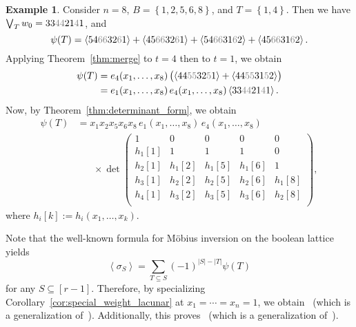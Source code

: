 \documentclass[reqno]{amsart}
\newcommand{\0}{\phantom{c}}
\newcommand{\swt}[1]{\left\langle #1 \right\rangle} %
\let\sumnonlimits\sum
\renewcommand{\sum}{\sumnonlimits\limits}
\newcommand{\set}[1]{\left\{ #1 \right\}}
\newcommand{\ive}[1]{\left[ #1 \right]}
\theoremstyle{plain}
\theoremstyle{definition}
\newtheorem{example}[thm]{Example}
\numberwithin{equation}{section}
\begin{document}
\begin{example}
Consider $n = 8$, $B = \set{1,2,5,6,8}$, and $T = \set{1,4}$.
Then we have $\bigvee_T w_0 = 33{\color{gray}44}21{\color{gray}4}1$, and
\[
\psi(T) = \swt{54{\color{gray}66}32{\color{gray}6}1} + \swt{45{\color{gray}66}32{\color{gray}6}1} + \swt{54{\color{gray}66}31{\color{gray}6}2} + \swt{45{\color{gray}66}31{\color{gray}6}2}.
\]
Applying Theorem~\ref{thm:merge} to $t = 4$ then to $t=1$, we obtain
\begin{align*}
\psi(T) & = e_4(x_1, \dotsc, x_8) \, \bigl( \swt{44{\color{gray}55}32{\color{gray}5}1} + \swt{44{\color{gray}55}31{\color{gray}5}2} \bigr)
\\ & = e_1(x_1, \dotsc, x_8) \, e_4(x_1, \dotsc, x_8) \swt{33{\color{gray}44}21{\color{gray}4}1}.
\end{align*}
Now, by Theorem~\ref{thm:determinant_form}, we obtain
\begin{align*}
\psi(T) & = x_1 x_2 x_5 x_6 x_8 \, e_1(x_1, \dotsc, x_8) \, e_4(x_1, \dotsc, x_8)
\\ & \hspace{20pt} \times \det \begin{pmatrix}
1 & 0 & 0 & 0 & 0 \\
h_1[1] & 1 & 1 & 1 & 0 \\
h_2[1] & h_1[2] & h_1[5] & h_1[6] & 1 \\
h_3[1] & h_2[2] & h_2[5] & h_2[6] & h_1[8] \\
h_4[1] & h_3[2] & h_3[5] & h_3[6] & h_2[8] \\
\end{pmatrix},
\end{align*}
where $h_i[k] := h_i(x_1, \dotsc, x_k)$.
\end{example}

Note that the well-known formula for M\"obius inversion on the boolean lattice yields
\[
\swt{\sigma_S} = \sum_{T\subseteq S} (-1)^{|S|-|T|} \psi(T)
\]
for any $S \subseteq \ive{r-1}$.
Therefore, by specializing Corollary~\ref{cor:special_weight_lacunar} at $x_1 = \cdots = x_n = 1$, we obtain~\cite[Conj.~3.10]{AasLin17} (which is a generalization of~\cite[Conj.~3.9]{AasLin17}).
Additionally, this proves~\cite[Conj.~3.6]{AasLin17} (which is a generalization of~\cite[Conj.~3.4]{AasLin17}).










\end{document}

